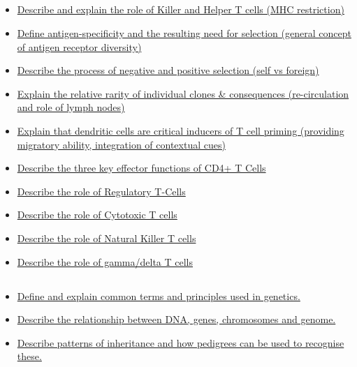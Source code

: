 \documentclass[10pt, a4paper]{article}
\newcommand{\MYhref}[3][blue]{\href{#2}{\color{#1}{#3}}}%
\begin{document}
\subsection{\MYhref[melbBlue]{https://notion.so/d8c56ad4ccdc414ba08b78458e41e637}{Adaptive Immunity}} \begin{itemize} \item \href{https://www.notion.so/1935a723978f40d0ba892eca2b5dde97}{Describe and explain the role of Killer and Helper T cells (MHC restriction)} \item \href{https://www.notion.so/07b6afb24bb649cf9d69734ea7e73380}{Define antigen-specificity and the resulting need for selection (general concept of antigen receptor diversity)} \item \href{https://www.notion.so/02e189ce7831419cb61829a4e1935ef7}{Describe the process of negative and positive selection (self vs foreign)} \item \href{https://www.notion.so/0a96d9aeaafd48b2beb1b0f70211b738}{Explain the relative rarity of individual clones \& consequences (re-circulation and role of lymph nodes)} \item \href{https://www.notion.so/54bb915d489b46088f99daae672004c1}{Explain that dendritic cells are critical inducers of T cell priming (providing migratory ability, integration of contextual cues)} \item \href{https://www.notion.so/c1af47ec300b42a08d5a565272ffde79}{Describe the three key effector functions of CD4+ T Cells} \item \href{https://www.notion.so/fbd99b9e926b4fe89ad4aeac57f37c54}{Describe the role of Regulatory T-Cells} \item \href{https://www.notion.so/ac2f83d0cad3429198d6af0afe94fcad}{Describe the role of Cytotoxic T cells} \item \href{https://www.notion.so/c7550a7f4c0542f8b2ef81f3fb7f40bf}{Describe the role of Natural Killer T cells} \item \href{https://www.notion.so/21b060cf4a8f4438b7705c4d991e8817}{Describe the role of gamma/delta T cells} \end{itemize}
\subsection{\MYhref[melbBlue]{https://notion.so/4f3b9fde91fe412a826c96729a5d3e65}{Introduction to Genetics}} \begin{itemize} \item \href{https://www.notion.so/ff14c59e116b49639e0c333b8b6f6ca9}{Define and explain common terms and principles used in genetics.} \item \href{https://www.notion.so/ac5806e89ccf40a58fee18135eb7ed3f}{Describe the relationship between DNA, genes, chromosomes and genome.} \item \href{https://www.notion.so/64c9394250db446d9f82e690e0682526}{Describe patterns of inheritance and how pedigrees can be used to recognise these.} \end{itemize}
\end{document}
